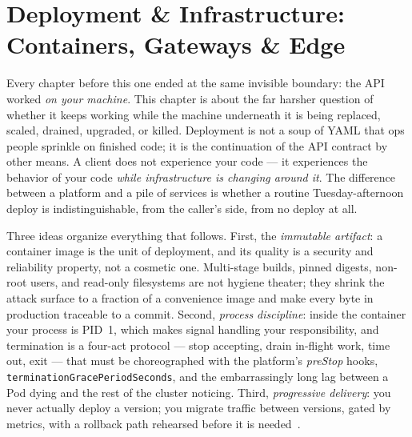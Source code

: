 \chapter{Deployment \& Infrastructure: Containers, Gateways \& Edge}
\label{ch:deployment}

Every chapter before this one ended at the same invisible boundary: the
API worked \emph{on your machine}. This chapter is about the far harsher
question of whether it keeps working while the machine underneath it is
being replaced, scaled, drained, upgraded, or killed. Deployment is not a
soup of YAML that ops people sprinkle on finished code; it is the
continuation of the API contract by other means. A client does not
experience your code --- it experiences the behavior of your code
\emph{while infrastructure is changing around it}. The difference between
a platform and a pile of services is whether a routine Tuesday-afternoon
deploy is indistinguishable, from the caller's side, from no deploy at all.

Three ideas organize everything that follows. First, the \emph{immutable
artifact}: a container image is the unit of deployment, and its quality is
a security and reliability property, not a cosmetic one. Multi-stage
builds, pinned digests, non-root users, and read-only filesystems are not
hygiene theater; they shrink the attack surface to a fraction of a
convenience image and make every byte in production traceable to a
commit. Second, \emph{process discipline}: inside the container your
process is PID~1, which makes signal handling your responsibility, and
termination is a four-act protocol --- stop accepting, drain in-flight
work, time out, exit --- that must be choreographed with the platform's
\emph{preStop} hooks, \texttt{terminationGracePeriodSeconds}, and the
embarrassingly long lag between a Pod dying and the rest of the cluster
noticing. Third, \emph{progressive delivery}: you never actually deploy a
version; you migrate traffic between versions, gated by metrics, with a
rollback path rehearsed before it is needed~\cite{nygard2018releaseit,beyer2016sre}.

